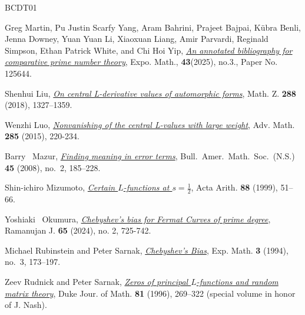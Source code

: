 \documentclass[12pt,reqno]{amsart}
\theoremstyle{definition}
\numberwithin{equation}{section}
\begin{document}
\begin{thebibliography}{BCDT01}



Greg Martin, Pu Justin Scarfy Yang, Aram Bahrini, Prajeet Bajpai, K\"{u}bra Benli, Jenna Downey, Yuan Yuan Li, Xiaoxuan Liang, Amir Parvardi,
Reginald Simpson, Ethan Patrick White, and Chi Hoi Yip, \href{https://www.sciencedirect.com/science/article/pii/S0723086924001117?via%3Dihub}{\emph{An annotated bibliography for comparative prime number
theory}}, Expo. Math., \textbf{43}(2025), no.3., Paper No. 125644. 

Shenhui Liu, \href{https://link.springer.com/article/10.1007/s00209-017-1936-6} {\emph{On central L-derivative values of automorphic forms}}, Math. Z. \textbf{288} (2018), 1327–1359. 

Wenzhi Luo, \href{https://www.sciencedirect.com/science/article/pii/S0001870815003035} {\emph{Nonvanishing of the central L-values with large weight}}, Adv. Math. \textbf{285} (2015), 220-234. 

 Barry \ Mazur,  \href{https://www.ams.org/journals/bull/2008-45-02/S0273-0979-08-01207-X/} {\emph{\it Finding meaning in error terms}}, 
Bull.\ Amer.\ Math.\ Soc.\ (N.S.) {\bf 45} (2008), no.\ 2, 185--228.

Shin-ichiro Mizumoto, \href{http://matwbn.icm.edu.pl/ksiazki/aa/aa88/aa8814.pdf} {\emph{Certain $L$-functions at $s = \frac{1}{2}$}}, Acta Arith. {\bf 88} (1999), 51--66. 

Yoshiaki ~Okumura, \href{ https://doi.org/10.1007/s11139-024-00913-7}{\emph{Chebyshev's bias for Fermat Curves of prime degree}}, Ramanujan J. \textbf{65} (2024), no. 2, 725-742.


Michael Rubinstein and Peter Sarnak, \emph{\href{http://projecteuclid.org/euclid.em/1048515870}{Chebyshev's
  Bias}}, Exp. Math.
  \textbf{3} (1994), no.~3, 173--197.


 Zeev Rudnick and Peter Sarnak,   \href{https://projecteuclid.org/journals/duke-mathematical-journal/volume-81/issue-2/Zeros-of-principal-L-functions-and-random-matrix-theory/10.1215/S0012-7094-96-08115-6.short}{\emph{Zeros of principal $L$-functions and random matrix theory}}, Duke Jour. of Math. \textbf{81} (1996), 269--322 (special volume in honor of J. Nash).




\end{thebibliography}
\end{document}
